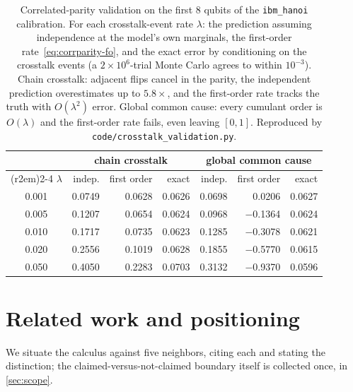 \documentclass[a4paper,onecolumn,unpublished,nopdfoutputerror,allowtoday]{quantumarticle}
\numberwithin{equation}{section}
\theoremstyle{plain}
\theoremstyle{definition}
\theoremstyle{remark}
\begin{document}
\begin{table}[t]
\centering
\caption{Correlated-parity validation on the first $8$ qubits of the
\texttt{ibm\_hanoi} calibration. For each crosstalk-event rate $\lambda$: the
prediction assuming independence at the model's own marginals, the first-order
rate~\eqref{eq:corrparity-fo}, and the exact error by conditioning on the
crosstalk events (a $2\times10^6$-trial Monte Carlo agrees to within
$10^{-3}$). Chain crosstalk: adjacent flips cancel in the parity, the
independent prediction overestimates up to $5.8\times$, and the first-order
rate tracks the truth with $O(\lambda^2)$ error. Global common cause: every
cumulant order is $O(\lambda)$ and the first-order rate fails, even leaving
$[0,1]$. Reproduced by \texttt{code/crosstalk\_validation.py}.}
\label{tab:crosstalk}
\small
\begin{tabular}{c rrr @{\hskip 2em} rrr}
\toprule
 & \multicolumn{3}{c}{chain crosstalk} & \multicolumn{3}{c}{global common cause} \\
\cmidrule(r{2em}){2-4} \cmidrule{5-7}
$\lambda$ & indep. & first order & exact & indep. & first order & exact \\
\midrule
0.001 & 0.0749 & 0.0628 & 0.0626 & 0.0698 & \phantom{$-$}0.0206 & 0.0627 \\
0.005 & 0.1207 & 0.0654 & 0.0624 & 0.0968 & $-$0.1364 & 0.0624 \\
0.010 & 0.1717 & 0.0735 & 0.0623 & 0.1285 & $-$0.3078 & 0.0621 \\
0.020 & 0.2556 & 0.1019 & 0.0628 & 0.1855 & $-$0.5770 & 0.0615 \\
0.050 & 0.4050 & 0.2283 & 0.0703 & 0.3132 & $-$0.9370 & 0.0596 \\
\bottomrule
\end{tabular}
\end{table}


\section{Related work and positioning}
\label{sec:related}

We situate the calculus against five neighbors, citing each and stating the
distinction; the claimed-versus-not-claimed boundary itself is collected once,
in \cref{sec:scope}.
\end{document}
